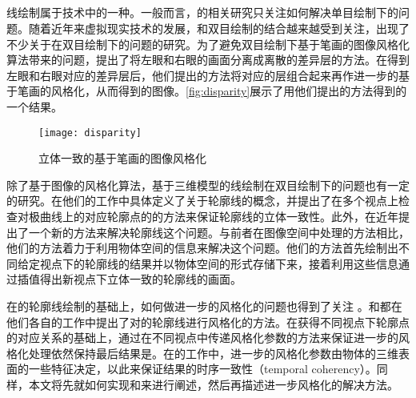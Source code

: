 \subsection{\stc{}\npr{}}

线绘制属于\npr{}技术中的一种。一般而言，\npr{}的相关研究只关注如何解决单目绘制下的问题。随着近年来虚拟现实技术的发展，\npr{}和双目绘制的结合越来越受到关注，出现了不少关于\npr{}在双目绘制下的问题的研究。为了避免双目绘制下基于笔画的图像风格化算法\cite{hertzmann1998painterly}带来的问题，\citeauthor{northam2012consistent}\cite{northam2012consistent,northam2013stereoscopic}提出了将左眼和右眼的画面分离成离散的差异层的方法。在得到左眼和右眼对应的差异层后，他们提出的方法将对应的层组合起来再作进一步的基于笔画的风格化，从而得到\stc{}的图像。\autoref{fig:disparity}展示了用他们提出的方法得到的一个结果。

\begin{figure}[tbh]
    \centering
    \texttt{[image: disparity]}
    \caption{\label{fig:disparity}
    立体一致的基于笔画的图像风格化}
\end{figure}

除了基于图像的风格化算法，基于三维模型的线绘制在双目绘制下的问题也有一定的研究。\citeauthor{kim2013stereoscopic}在他们的工作中具体定义了关于轮廓线的\stc{}概念，并提出了在多个视点上检查对极曲线上的对应轮廓点的的方法来保证轮廓线的立体一致性。此外，\citeauthor{bukenberger2018stereo}在近年提出了一个新的方法\cite{bukenberger2018stereo}来解决\stc{}轮廓线这个问题。与前者在图像空间中处理的方法相比，他们的方法着力于利用物体空间的信息来解决这个问题。他们的方法首先绘制出不同给定视点下的轮廓线的结果并以物体空间的形式存储下来，接着利用这些信息通过插值得出新视点下立体一致的轮廓线的画面。

在\stc{}的轮廓线绘制的基础上，如何做进一步的风格化的问题也得到了关注\cite{northrup2000artistic,kalnins2003coherent} 。\citeauthor{kim2013stereoscopic}和\citeauthor{bukenberger2018stereo}都在他们各自的工作中提出了对\stc{}的轮廓线进行风格化的方法。在获得不同视点下轮廓点的对应关系的基础上，\citeauthor{kim2013stereoscopic}通过在不同视点中传递风格化参数的方法来保证进一步的风格化处理依然保持最后结果是\stc{}。在\citeauthor{bukenberger2018stereo}的工作中，进一步的风格化参数由物体的三维表面的一些特征决定，以此来保证结果的时序一致性（temporal coherency）。同样，本文将先就如何实现\stc{}\con{}和\scon{}来进行阐述，然后再描述进一步风格化的解决方法。

\subsection{\ppll{}}

